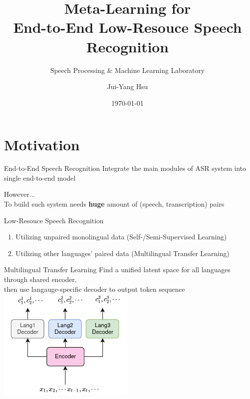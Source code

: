 \documentclass{beamer}
\title{Meta-Learning for\\ End-to-End Low-Resouce Speech Recognition}
\subtitle{\textcolor[rgb]{0.00,0.50,1.00}{{Speech Processing \& Machine Learning Laboratory}}}
\author{Jui-Yang Hsu}
\date{\today}
\begin{document}
\begin{frame}
\maketitle
\end{frame}




\section{Motivation}
\begin{frame}{End-to-End Speech Recognition}
  Integrate the main modules of ASR system into single end-to-end model
  \vspace{2em}

  \pause

  However...\\
  To build such system needs \textbf{huge} amount of (speech, transcription) pairs
\end{frame}

\begin{frame}{Low-Resouce Speech Recognition}
  \begin{enumerate}
    \item Utilizing unpaired monolingual data (Self-/Semi-Supervised Learning)
    \item Utilizing other languages' paired data (Multilingual Transfer Learning)
  \end{enumerate}
\end{frame}

\begin{frame}{Multilingual Transfer Learning}
  Find a unified latent space for all languages through shared encoder, \\
  then use langauge-specific decoder to output token sequence
  \center \includegraphics[width=0.5\textwidth]{fig/MultiTaskASR.png}
\end{frame}
\end{document}
